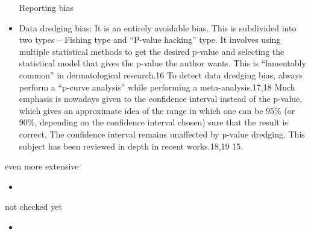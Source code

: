 \documentclass[12pt, a4paper, oneside]{book}   	%
\newif\ifrawcitationactive
\newcommand{\rawcitationend}{\color{black}\rawcitationactivefalse}
\newcommand{\rawcitationusedend}{%
	\ifrawcitationactive
	\color{purple}  %
	\else
	\color{black}  %
	\fi
}
\begin{document}
\begin{itemize}
				Reporting bias
				\item  Data dredging bias: It is an entirely avoidable bias. This is subdivided into two types – Fishing type and “P-value hacking” type. It involves using multiple statistical methods to get the desired p-value and selecting the statistical model that gives the p-value the author wants. This is “lamentably common” in dermatological research.16 To detect data dredging bias, always perform a “p-curve analysis” while performing a meta-analysis.17,18 Much emphasis is nowadays given to the confidence interval instead of the p-value, which gives an approximate idea of the range in which one can be 95\% (or 90\%, depending on the confidence interval chosen) sure that the result is correct. The confidence interval remains unaffected by p-value dredging. This subject has been reviewed in depth in recent works.18,19 15.\autocite{Chakraborty_2023}
				\rawcitationusedend
			\end{itemize}
			
			even more extensive
			\begin{itemize}
				\item 
			\end{itemize}
			
			not checked yet
			\begin{itemize}
				\item 
			\end{itemize}
			\rawcitationend
			
\end{document}
